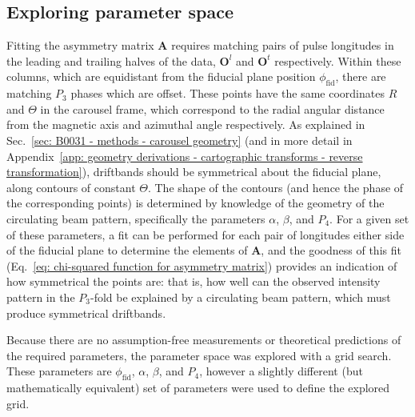 








\subsection{Exploring parameter space}
\label{sec: B0031 - methods - parameter space}

Fitting the asymmetry matrix $\mathbf{A}$ requires matching pairs of pulse longitudes in the leading and trailing halves of the data, $\mathbf{O}^l$ and $\mathbf{O}^t$ respectively. Within these columns, which are equidistant from the fiducial plane position $\phi_\mathrm{fid}$, there are matching $P_3$ phases which are offset. These points have the same coordinates $R$ and $\Theta$ in the carousel frame, which correspond to the radial angular distance from the magnetic axis and azimuthal angle respectively. As explained in Sec.~\ref{sec: B0031 - methods - carousel geometry} (and in more detail in Appendix~\ref{app: geometry derivations - cartographic transforms - reverse transformation}), driftbands should be symmetrical about the fiducial plane, along contours of constant $\Theta$. The shape of the contours (and hence the phase of the corresponding points) is determined by knowledge of the geometry of the circulating beam pattern, specifically the parameters $\alpha$, $\beta$, and $P_4$. For a given set of these parameters, a fit can be performed for each pair of longitudes either side of the fiducial plane to determine the elements of $\mathbf{A}$, and the goodness of this fit (Eq.~\eqref{eq: chi-squared function for asymmetry matrix}) provides an indication of how symmetrical the points are: that is, how well can the observed intensity pattern in the $P_3$-fold be explained by a circulating beam pattern, which must produce symmetrical driftbands.

Because there are no assumption-free measurements or theoretical predictions of the required parameters, the parameter space was explored with a grid search. These parameters are $\phi_\mathrm{fid}$, $\alpha$, $\beta$, and $P_4$, however a slightly different (but mathematically equivalent) set of parameters were used to define the explored grid.

